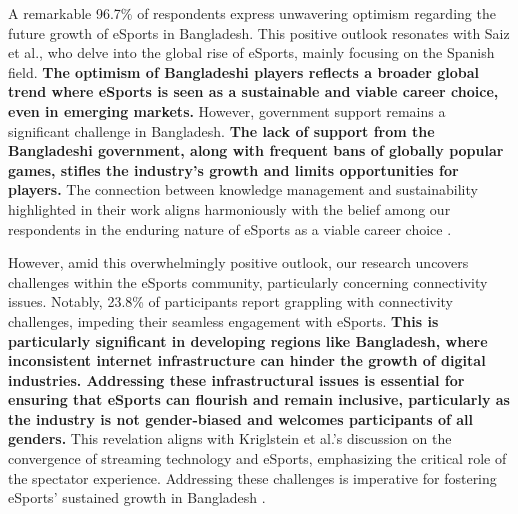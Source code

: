 \documentclass[manuscript,screen,review,anonymous]{acmart}
\begin{document}
A remarkable 96.7\% of respondents express unwavering optimism regarding the future growth of eSports in Bangladesh. This positive outlook resonates with Saiz et al., who delve into the global rise of eSports, mainly focusing on the Spanish field. \textbf{The optimism of Bangladeshi players reflects a broader global trend where eSports is seen as a sustainable and viable career choice, even in emerging markets.} However, government support remains a significant challenge in Bangladesh. \textbf{The lack of support from the Bangladeshi government, along with frequent bans of globally popular games, stifles the industry's growth and limits opportunities for players.} The connection between knowledge management and sustainability highlighted in their work aligns harmoniously with the belief among our respondents in the enduring nature of eSports as a viable career choice \cite{a21}.

However, amid this overwhelmingly positive outlook, our research uncovers challenges within the eSports community, particularly concerning connectivity issues. Notably, 23.8\% of participants report grappling with connectivity challenges, impeding their seamless engagement with eSports. \textbf{This is particularly significant in developing regions like Bangladesh, where inconsistent internet infrastructure can hinder the growth of digital industries. Addressing these infrastructural issues is essential for ensuring that eSports can flourish and remain inclusive, particularly as the industry is not gender-biased and welcomes participants of all genders.} This revelation aligns with Kriglstein et al.'s discussion on the convergence of streaming technology and eSports, emphasizing the critical role of the spectator experience. Addressing these challenges is imperative for fostering eSports' sustained growth in Bangladesh \cite{a8}.




\end{document}
